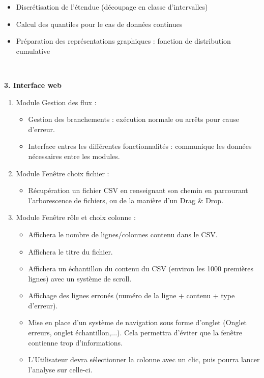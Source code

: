 \begin{description}[style=unboxed,leftmargin=0.2cm]
\begin{enumerate}
						\begin{itemize}
						\item Discrétisation de l'étendue (découpage en classe d'intervalles)
						\item Calcul des quantiles pour le cas  de données continues
						\item Préparation des représentations graphiques : fonction de distribution cumulative
						\end{itemize}
				\end{enumerate}
				~\\
				\item\textbf{3. Interface web}
				\begin{enumerate}
					\item Module Gestion des flux :
						\begin{itemize}
						\item Gestion des branchements : exécution normale ou arrêts pour cause d'erreur.
						\item Interface entres les différentes fonctionnalités : communique les données nécessaires entre les modules.
						\end{itemize}
						
					\item Module Fenêtre choix fichier :
						\begin{itemize}
						\item Récupération un fichier CSV en renseignant son chemin en parcourant l'arborescence de fichiers, ou de la manière d'un Drag \& Drop.
						\end{itemize}
						
					\item Module Fenêtre rôle et choix colonne :
						\begin{itemize}
						\item Affichera le nombre de lignes/colonnes contenu dans le CSV.
						\item Affichera le titre du fichier.
						\item Affichera un échantillon du contenu du CSV (environ les 1000 premières lignes) avec un système de scroll.
						\item Affichage des lignes erronés (numéro de la ligne + contenu + type d'erreur).
						\item Mise en place d'un système de navigation sous forme d'onglet (Onglet erreurs, onglet échantillon,...). Cela permettra d'éviter que la fenêtre contienne trop d'informations.
						\item L'Utilisateur devra sélectionner la colonne avec un clic, puis pourra lancer l'analyse sur celle-ci. 
						\end{itemize}
					

\end{enumerate}
\end{description}
